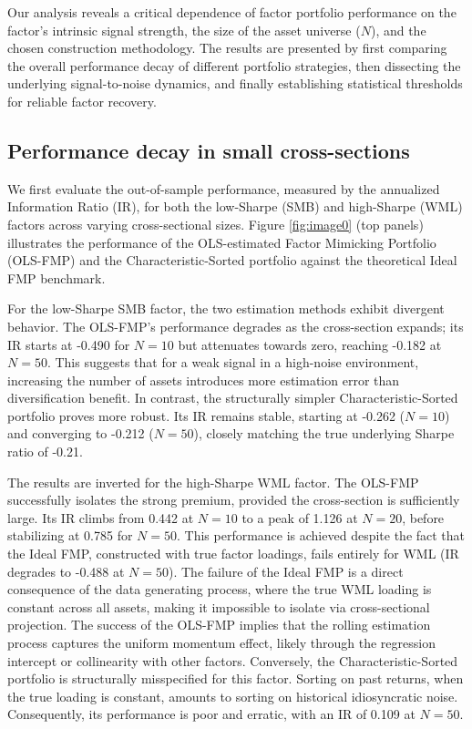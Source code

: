 \documentclass[]{article}
\begin{document}
Our analysis reveals a critical dependence of factor portfolio performance on the factor's intrinsic signal strength, the size of the asset universe ($N$), and the chosen construction methodology. The results are presented by first comparing the overall performance decay of different portfolio strategies, then dissecting the underlying signal-to-noise dynamics, and finally establishing statistical thresholds for reliable factor recovery.

\subsection{Performance decay in small cross-sections}

We first evaluate the out-of-sample performance, measured by the annualized Information Ratio (IR), for both the low-Sharpe (SMB) and high-Sharpe (WML) factors across varying cross-sectional sizes. Figure \ref{fig:image0} (top panels) illustrates the performance of the OLS-estimated Factor Mimicking Portfolio (OLS-FMP) and the Characteristic-Sorted portfolio against the theoretical Ideal FMP benchmark.

For the low-Sharpe SMB factor, the two estimation methods exhibit divergent behavior. The OLS-FMP's performance degrades as the cross-section expands; its IR starts at -0.490 for $N=10$ but attenuates towards zero, reaching -0.182 at $N=50$. This suggests that for a weak signal in a high-noise environment, increasing the number of assets introduces more estimation error than diversification benefit. In contrast, the structurally simpler Characteristic-Sorted portfolio proves more robust. Its IR remains stable, starting at -0.262 ($N=10$) and converging to -0.212 ($N=50$), closely matching the true underlying Sharpe ratio of -0.21.

The results are inverted for the high-Sharpe WML factor. The OLS-FMP successfully isolates the strong premium, provided the cross-section is sufficiently large. Its IR climbs from 0.442 at $N=10$ to a peak of 1.126 at $N=20$, before stabilizing at 0.785 for $N=50$. This performance is achieved despite the fact that the Ideal FMP, constructed with true factor loadings, fails entirely for WML (IR degrades to -0.488 at $N=50$). The failure of the Ideal FMP is a direct consequence of the data generating process, where the true WML loading is constant across all assets, making it impossible to isolate via cross-sectional projection. The success of the OLS-FMP implies that the rolling estimation process captures the uniform momentum effect, likely through the regression intercept or collinearity with other factors. Conversely, the Characteristic-Sorted portfolio is structurally misspecified for this factor. Sorting on past returns, when the true loading is constant, amounts to sorting on historical idiosyncratic noise. Consequently, its performance is poor and erratic, with an IR of 0.109 at $N=50$.
\end{document}
